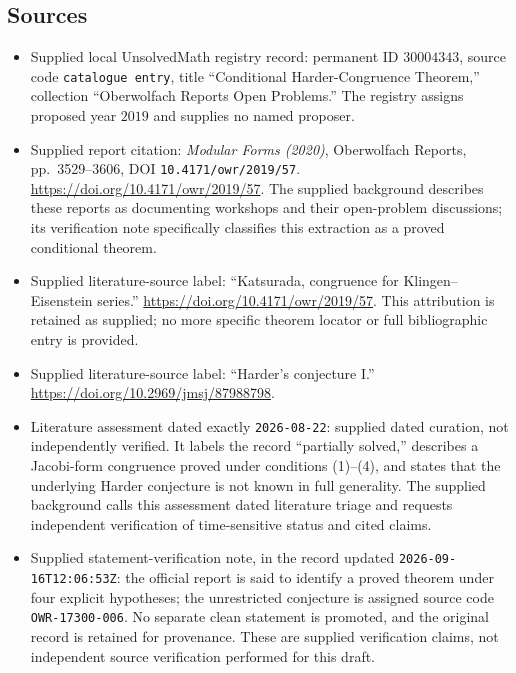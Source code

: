 \documentclass[11pt]{article}
\begin{document}
\subsection{Sources}
\begin{itemize}
\item Supplied local UnsolvedMath registry record: permanent ID \(30004343\), source code \texttt{catalogue entry}, title ``Conditional Harder-Congruence Theorem,'' collection ``Oberwolfach Reports Open Problems.'' The registry assigns proposed year \(2019\) and supplies no named proposer.
\item Supplied report citation: \emph{Modular Forms (2020)}, Oberwolfach Reports, pp.\ 3529--3606, DOI \texttt{10.4171/owr/2019/57}. \url{https://doi.org/10.4171/owr/2019/57}. The supplied background describes these reports as documenting workshops and their open-problem discussions; its verification note specifically classifies this extraction as a proved conditional theorem.
\item Supplied literature-source label: ``Katsurada, congruence for Klingen--Eisenstein series.'' \url{https://doi.org/10.4171/owr/2019/57}. This attribution is retained as supplied; no more specific theorem locator or full bibliographic entry is provided.
\item Supplied literature-source label: ``Harder's conjecture I.'' \url{https://doi.org/10.2969/jmsj/87988798}.
\item Literature assessment dated exactly \texttt{2026-08-22}: supplied dated curation, not independently verified. It labels the record ``partially solved,'' describes a Jacobi-form congruence proved under conditions (1)--(4), and states that the underlying Harder conjecture is not known in full generality. The supplied background calls this assessment dated literature triage and requests independent verification of time-sensitive status and cited claims.
\item Supplied statement-verification note, in the record updated \texttt{2026-09-16T12:06:53Z}: the official report is said to identify a proved theorem under four explicit hypotheses; the unrestricted conjecture is assigned source code \texttt{OWR-17300-006}. No separate clean statement is promoted, and the original record is retained for provenance. These are supplied verification claims, not independent source verification performed for this draft.
\end{itemize}
\end{document}
